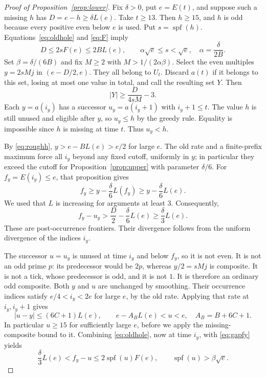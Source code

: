 \documentclass[11pt]{article}
\theoremstyle{remark}
\newcommand{\U}{U}
\newcommand{\spf}{\operatorname{spf}}
\begin{document}
\begin{proof}[Proof of Proposition~\ref{prop:lower}]

Fix $\delta>0$, put $e=E(t)$, and suppose such a missing $h$ has
$D=e-h\geq\delta L(e)$.
Take $t\geq13$. Then $h\geq15$, and $h$ is odd because every
positive even below $e$ is used. Put $s=\spf(h)$.
Equations~\eqref{eq:oldhole} and \eqref{eq:F} imply
\begin{equation}\label{eq:roughh}
 D\leq2sF(e)\leq2B L(e),\qquad
 \alpha\sqrt e\leq s<\sqrt e,\quad \alpha=\frac\delta{2B}.
\end{equation}
Set $\beta=\delta/(6B)$ and fix $M\geq2$ with
$M>1/(2\alpha\beta)$.
Select the even multiples $y=2sMj$ in $(e-D/2,e)$.
They all belong to $\U_t$. Discard $a(t)$ if it belongs to this
set, losing at most one value in total, and call the resulting set $Y$.
Then
\begin{equation}\label{eq:Ylower}
 |Y|\geq\frac{D}{4sM}-3.
\end{equation}
Each $y=a(i_y)$ has a successor $u_y=a(i_y+1)$ with $i_y+1\leq t$.
The value $h$ is still unused and eligible after $y$, so
$u_y\leq h$ by the greedy rule. Equality is impossible since $h$
is missing at time $t$. Thus $u_y<h$.

By \eqref{eq:roughh}, $y>e-BL(e)>e/2$ for large $e$.
The old rate and a finite-prefix maximum force all $i_y$ beyond
any fixed cutoff, uniformly in $y$; in particular they exceed the
cutoff for Proposition~\ref{prop:upper} with parameter $\delta/6$.
For $f_y=E(i_y)\leq e$, that proposition gives
\[
 f_y\geq y-\frac\delta6 L(f_y)
       \geq y-\frac\delta6 L(e).
\]
We used that $L$ is increasing for arguments at least $3$.
Consequently,
\begin{equation}\label{eq:gapfy}
 f_y-u_y>\frac D2-\frac\delta6L(e)
                  \geq\frac\delta3L(e).
\end{equation}
These are post-occurrence frontiers. Their divergence follows from
the uniform divergence of the indices $i_y$.

The successor $u=u_y$ is unused at time $i_y$ and below $f_y$,
so it is not even. It is not an odd prime $p$: its predecessor
would be $2p$, whereas $y/2=sMj$ is composite. It is not a tick,
whose predecessor is odd, and it is not $1$.
It is therefore an ordinary odd composite.
Both $y$ and $u$ are unchanged by smoothing. Their occurrence
indices satisfy $e/4<i_y<2e$ for large $e$, by the old rate.
Applying that rate at $i_y,i_y+1$ gives
\[
 |u-y|\leq(6C+1)L(e),\qquad
 e-A_B L(e)<u<e,\quad A_B=B+6C+1.
\]
In particular $u\geq15$ for sufficiently large $e$, before we
apply the missing-composite bound to it.
Combining \eqref{eq:oldhole}, now at time $i_y$, with
\eqref{eq:gapfy} yields
\[
 \frac\delta3 L(e)<f_y-u\leq2\spf(u)F(e),
 \qquad \spf(u)>\beta\sqrt e.
\]


\end{proof}
\end{document}
